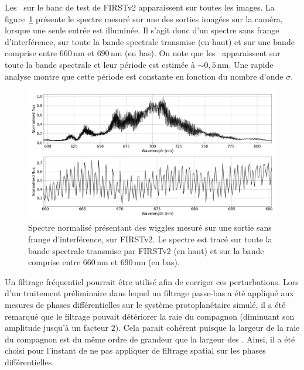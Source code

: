 Les \wiggles~sur le banc de test de \ac{FIRSTv2} apparaissent sur toutes les images. La figure~\ref{fig:WigglesFlat} présente le spectre mesuré sur une des sorties imagées sur la caméra, lorsque une seule entrée est illuminée. Il s'agit donc d'un spectre sans frange d'interférence, sur toute la bande spectrale transmise (en haut) et sur une bande comprise entre $660 \,$nm et $690 \,$nm (en bas). On note que les \wiggles~apparaissent sur toute la bande spectrale et leur période est estimée à $\sim 0,5 \,$nm. Une rapide analyse montre que cette période est constante en fonction du nombre d'onde $\sigma$.

\begin{figure}[ht!]
    \centering
    \includegraphics[width=\figwidth]{Figure_Chap4/20220811_P2VM_01_Flat1_1_FluxVSWave_Pola1.png}
    \caption[Spectre présentant des wiggles mesuré sur une sortie sans frange d'interférence, sur FIRSTv2.]{Spectre normalisé présentant des wiggles mesuré sur une sortie sans frange d'interférence, sur FIRSTv2. Le spectre est tracé sur toute la bande spectrale transmise par FIRSTv2 (en haut) et sur la bande comprise entre $660 \,$nm et $690 \,$nm (en bas).}
    \label{fig:WigglesFlat}
\end{figure}

Un filtrage fréquentiel pourrait être utilisé afin de corriger ces perturbations. Lors d'un traitement préliminaire dans lequel un filtrage passe-bas a été appliqué aux mesures de phases différentielles sur le système protoplanétaire simulé, il a été remarqué que le filtrage pouvait détériorer la raie du compagnon (diminuant son amplitude jusqu'à un facteur $2$). Cela parait cohérent puisque la largeur de la raie du compagnon est du même ordre de grandeur que la largeur des \wiggles. Ainsi, il a été choisi pour l'instant de ne pas appliquer de filtrage spatial sur les phases différentielles.

